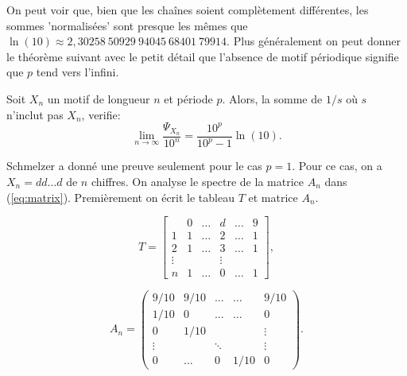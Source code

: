 \noindent On peut voir que, bien que les chaînes soient complètement différentes, les
sommes 'normalisées' sont presque les mêmes que $\ln(10) \approx 2,30258\
50929\ 94045\ 68401\ 79914$. Plus g\'en\'eralement on peut donner le
th\'eor\`eme suivant avec le petit d\'etail que l'absence de motif p\'eriodique
signifie que $p$ tend vers l'infini.
\begin{thm}
	Soit $X_{n}$ un motif de longueur $n$ et p\'eriode $p$. Alors, la somme de
	$1/s$ o\`u $s$ n'inclut pas $X_{n}$, verifie:
	\[
		\lim \limits_{n\rightarrow\infty}\frac{\Psi_{X_{n}}}{10^{n}} =
		\frac{10^{p}}{10^{p}-1}\ln(10).
	\]
    \label{thm:periode}
\end{thm}

Schmelzer a donn\'e une preuve seulement pour le cas $p=1$. Pour ce cas, on a
$X_{n} = dd\dots d$ de $n$ chiffres. On analyse le spectre de la matrice
$A_{n}$ dans (\ref{eq:matrix}). Premi\`erement on \'ecrit le tableau $T$ et matrice
$A_{n}$.\\
\begin{minipage}{0.45\textwidth}
\[
	T = 
\left[
\begin{array}{c|cccccccccc}
			& 0 & \dots & d & \dots & 9 \\
	\hline 1& 1 & \dots & 2 & \dots & 1 \\
		   2& 1 & \dots & 3 & \dots & 1 \\
	\vdots	&  &  & \vdots &  &  \\
		   n& 1 & \dots & 0 & \dots & 1
\end{array}
\right],
\]
\end{minipage}%
\begin{minipage}{0.55\textwidth}
\[
	A_{n} =
	\begin{pmatrix}
		9/10 & 9/10 & \ldots & \ldots & 9/10 \\
		1/10 & 0 & \ldots & \ldots & 0 \\
		0 & 1/10 &  &  & \vdots \\
		\vdots &  & \ddots &  & \vdots \\
		0 & \ldots & 0 & 1/10 & 0 
	\end{pmatrix}.
\]
\end{minipage}\\

